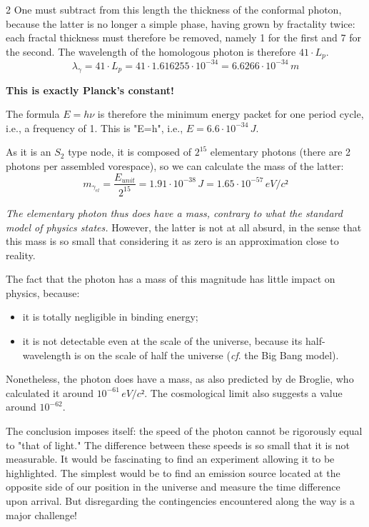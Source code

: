 \begin{multicols}{2}
	One must subtract from this length the thickness of the conformal photon, because the latter is no longer a simple phase, having grown by fractality twice: each fractal thickness must therefore be removed, namely 1 for the first and 7 for the second. The wavelength of the homologous photon is therefore $41 \cdot L_p$.
	\begin{equation*}
		\lambda_{\gamma} = 41 \cdot L_p = 41 \cdot 1.616255 \cdot 10^{-34} = 6.6266 \cdot 10^{-34}\,m
	\end{equation*}
	
	\textbf{This is exactly Planck's constant!}
	\medskip
	
	The formula $E=h\nu$ is therefore the minimum energy packet for one period cycle, i.e., a frequency of 1. This is "E=h", i.e., $E=6.6 \cdot 10^{-34}\,J$.
	\medskip
	
	As it is an $S_2$ type node, it is composed of $2^{15}$ elementary photons (there are 2 photons per assembled vorespace), so we can calculate the mass of the latter:
	\begin{equation*}
		m_{\gamma_{el}} = \frac {E_{unit}} {2^{15}} = 1.91 \cdot 10^{-38}\,J = 1.65 \cdot 10^{-57}\,eV/c²
	\end{equation*}
	
	\textit{The elementary photon thus does have a mass, contrary to what the standard model of physics states.} However, the latter is not at all absurd, in the sense that this mass is so small that considering it as zero is an approximation close to reality.
	
	The fact that the photon has a mass of this magnitude has little impact on physics, because:
	
	\begin{itemize}
		\item it is totally negligible in binding energy;
		\item it is not detectable even at the scale of the universe, because its half-wavelength is on the scale of half the universe (\textit{cf}. the Big Bang model).
	\end{itemize}
	
	Nonetheless, the photon does have a mass, as also predicted by de Broglie, who calculated it around $10^{-61}\,eV/c²$\cite{debroglie1956tentative}. The cosmological limit also suggests a value around $10^{-62}$.
	\medskip
	
	The conclusion imposes itself: the speed of the photon cannot be rigorously equal to "that of light." The difference between these speeds is so small that it is not measurable. It would be fascinating to find an experiment allowing it to be highlighted. The simplest would be to find an emission source located at the opposite side of our position in the universe and measure the time difference upon arrival. But disregarding the contingencies encountered along the way is a major challenge!
	

\end{multicols}
